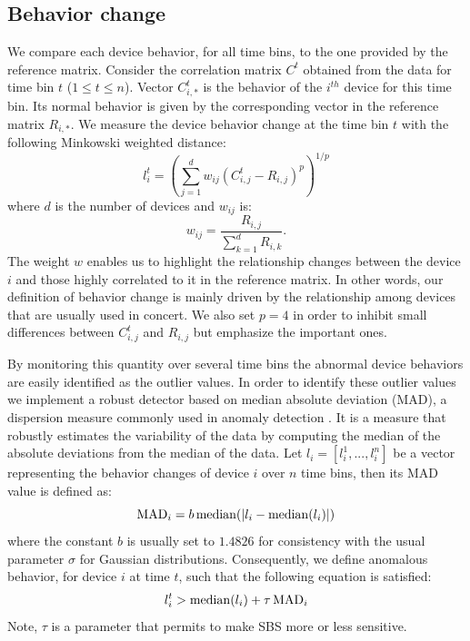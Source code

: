 \subsection{Behavior change}
We compare each device behavior, for all time bins, to the one provided by the reference matrix.  
Consider the correlation matrix $C^t$ obtained from the data for time bin $t$ ($1 \leq t \leq n$).  
Vector $C^t_{i,*}$ is the behavior of the $i^{th}$ device for this time bin.
Its normal behavior is given by the corresponding vector in the reference matrix $R_{i,*}$.
We measure the device behavior change at the time bin $t$ with the following Minkowski weighted distance:
\[ l^t_{i} = \left(\sum_{j=1}^d  w_{ij}\left(C^t_{i,j} - R_{i,j}\right)^p\right)^{1/p} \]
where $d$ is the number of devices and $w_{ij}$ is:
\[ w_{ij} = \frac{R_{i,j}}{\sum_{k=1}^d R_{i,k}}. \]
The weight $w$ enables us to highlight the relationship changes between the device $i$ and those highly correlated to it in the reference matrix.
In other words, our definition of behavior change is mainly driven by the relationship among devices that are usually used in concert.
We also set $p=4$ in order to inhibit small differences between $C^t_{i,j}$ and $R_{i,j}$ but emphasize the important ones.

By monitoring this quantity over several time bins the abnormal device behaviors are easily identified as the outlier values.
In order to identify these outlier values we implement a robust detector based on median absolute deviation (MAD), a dispersion measure commonly used in anomaly detection \cite{huber:wiley2009,chan:springer2005}.
It is a measure that robustly estimates the variability of the data by computing the median of the absolute deviations from the median of the data.
 Let $l_{i} = [l_i^1,...,l_i^n]$ be a vector representing the behavior changes of device $i$ over $n$ time bins, then its MAD value is defined as:
\[ \operatorname{MAD}_i = b \operatorname{median}(\lvert l_{i} - \operatorname{median}(l_{i})\rvert)\]
where the constant $b$ is usually set to $1.4826$ for consistency with the usual parameter $\sigma$ for Gaussian distributions.
Consequently, we define anomalous behavior, for device $i$ at time $t$, such that the following equation is satisfied:%
\[l^t_{i} > \operatorname{median}(l_{i}) + \tau  \operatorname{MAD}_i\]
Note, $\tau$ is a parameter that permits to make SBS more or less sensitive.

